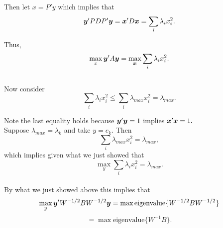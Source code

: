 \documentclass[12pt]{book}
\begin{document}
\begin{enumerate}
Then let $x = P'y$ which implies that
$$\bm{y}' PDP' \bm{y} = \bm{x}'D\bm{x} = \sum_i \lambda_i x_i^2.$$

Thus, $$\max_x \bm{y}' A \bm{y} = \max_{\bm{x}} \sum_i \lambda_i x_i^2.$$ \\

Now consider $$\sum_i \lambda_i x_i^2 \leq \sum_i \lambda_{max} x_i^2 = \lambda_{max}.$$

Note the last equality holds because $\bm{y}'\bm{y} = 1$ implies $\bm{x}'\bm{x} =1.$\\

Suppose $\lambda_{max} = \lambda_k$ and take $y = e_k.$ Then
$$ \sum_i \lambda_{max} x_i^2 = \lambda_{max},$$
which implies given what we just showed that 
$$\max_y \sum_i \lambda_i x_i^2 = \lambda_{max}.$$\\

By what we just showed above this implies that 
$$\max_y \bm{y}' W^{-1/2}BW^{-1/2}\bm{y} = \max \text{eigenvalue}\{W^{-1/2}BW^{-1/2}\}$$
$$= \max \text{eigenvalue}\{W^{-1}B\}.$$





\end{enumerate}
\end{document}
